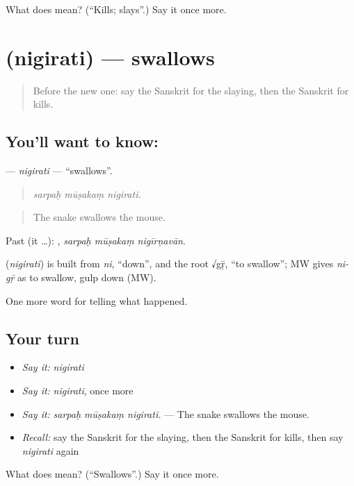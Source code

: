 \begin{tcolorbox}[breakable,colback=teal!4,colframe=teal!35!black,title={Before you move on}]
What does  mean? (\textquotedblleft{}Kills; slays\textquotedblright{}.) Say it once more.
\end{tcolorbox}
\section[\texorpdfstring{\sk{निगिरति} (nigirati)}{निगिरति (nigirati)}]{ (nigirati) — swallows}

\label{lesson:SA-C334-nigirati}



\begin{quote}
Before the new one: say the Sanskrit for the slaying, then the Sanskrit for kills.
\end{quote}

\subsection*{You'll want to know: }
\textbf{} — \emph{nigirati} — \textquotedblleft{}swallows\textquotedblright{}.

\begin{quote}
  
\end{quote}

\begin{quote}
\emph{sarpaḥ mūṣakaṃ nigirati.}
\end{quote}

\begin{quote}
The snake swallows the mouse.
\end{quote}

Past (it …):   , \emph{sarpaḥ mūṣakaṃ nigīrṇavān}.

\begin{cousinweb}
\textbf{} (\emph{nigirati}) is built from \emph{ni}, \textquotedblleft{}down\textquotedblright{}, and the root √gṝ, \textquotedblleft{}to swallow\textquotedblright{}; MW gives \emph{ni-gṝ} as to swallow, gulp down (MW).
\end{cousinweb}

\begin{grammarlens}[title={What you've built}]
One more word for telling what happened.
\end{grammarlens}

\subsection*{Your turn}
\begin{itemize}
\raggedright
  \item \emph{Say it:} \emph{nigirati}
  \item \emph{Say it:} \emph{nigirati}, once more
  \item \emph{Say it:} \emph{sarpaḥ mūṣakaṃ nigirati.} — The snake swallows the mouse.
  \item \emph{Recall:} say the Sanskrit for the slaying, then the Sanskrit for kills, then say \emph{nigirati} again
\end{itemize}

\begin{tcolorbox}[breakable,colback=teal!4,colframe=teal!35!black,title={Before you move on}]
What does  mean? (\textquotedblleft{}Swallows\textquotedblright{}.) Say it once more.
\end{tcolorbox}
